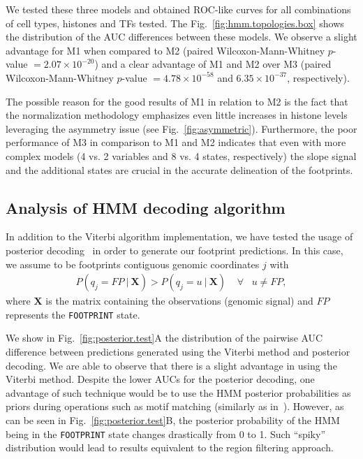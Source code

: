 \documentclass{bioinfo}
\begin{document}
We tested these three models and obtained {\color{black} ROC-like} curves for all combinations of
cell types, histones and TFs tested. The Fig.~\ref{fig:hmm.topologies.box} shows
the distribution of the AUC differences between these models. We observe a
slight advantage for M1 when compared to M2 (paired Wilcoxon-Mann-Whitney
$p$-value $ = 2.07 \times 10^{-20} $) and a clear advantage of M1 and M2 over
M3 (paired Wilcoxon-Mann-Whitney $p$-value $ = 4.78 \times 10^{-58} $ and
$ 6.35 \times 10^{-37} $, respectively). 

The possible reason for the good results of M1 in relation to M2 is the fact that the
normalization methodology emphasizes even little increases in histone levels leveraging
the asymmetry issue (see Fig.~\ref{fig:asymmetric}). Furthermore, the poor
performance of M3 in comparison to M1 and M2 indicates that even with more complex
models (4 vs. 2 variables and 8 vs. 4 states, respectively) the slope signal and
the additional states are crucial in the accurate delineation of the footprints.

\subsection{Analysis of HMM decoding algorithm}
\label{sec:hmm.posterior.test}

In addition to the Viterbi algorithm implementation, we have tested the usage
of posterior decoding~\citep{rabiner1989} in order to generate our footprint
predictions. In this case, we assume to be footprints contiguous genomic
coordinates $j$ with
\begin{align}
  P(q_{j} = F \! P \: | \: \mathbf{X}) > P(q_{j} = u \: | \: \mathbf{X}) \; \; \; \; \forall \; \; \; u \neq F \! P,
  \label{eq:posterior}
\end{align}
where $ \mathbf{X} $ is the matrix containing the observations (genomic signal) and
$F \! P$ represents the {\tt FOOTPRINT} state.

We show in Fig.~\ref{fig:posterior.test}A the distribution of the pairwise
AUC difference between predictions generated using the Viterbi method and
posterior decoding. We are able to observe that there is a slight advantage
in using the Viterbi method. Despite the lower AUCs for the posterior decoding,
one advantage of such technique would be to use the HMM posterior probabilities
as priors during operations such as motif matching (similarly as in~\cite{cuellar2012}).
However, as can be seen in Fig.~\ref{fig:posterior.test}B, the posterior probability
of the HMM being in the {\tt FOOTPRINT} state changes drastically from 0 to 1.
Such ``spiky'' distribution would lead to results equivalent to the region filtering approach.
\end{document}
